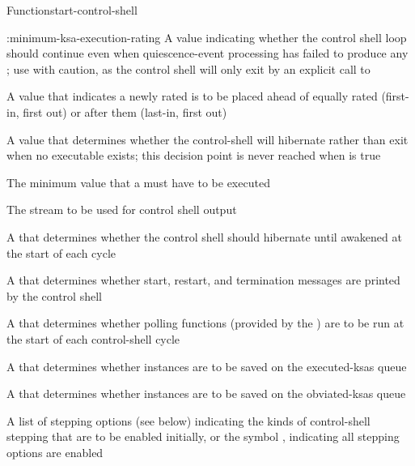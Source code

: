 \documentclass[10pt,twoside,english,pdftex]{article}
\begin{document}
\begin{functiondoc}{Function}{start-control-shell}
\begin{keywords}{:minimum-ksa-execution-rating}
   A  value
  indicating whether the control shell loop should continue even when
  quiescence-event processing has failed to produce any
  ; use with caution, as the control shell will only
  exit by an explicit call to \textbf{}

   A  value that
  indicates a newly rated  is to be placed ahead of equally
  rated  (first-in, first out) or after them (last-in, first out)

   A  value that
  determines whether the control-shell will hibernate rather than exit
  when no executable  exists; this decision point is never reached when
   is true

   The minimum  value
  that a  must have to be executed

   The stream to be used for control shell 
  output

  \keyword[:pause] A  that determines
  whether the control shell should hibernate until awakened at the
  start of each cycle

  \keyword[:print] A  that determines
  whether start, restart, and termination messages are printed by the
  control shell 

   A  that
  determines whether polling functions (provided by the
  )
  are to be run at the start of each control-shell cycle

   A  that determines
  whether  instances are to be saved on the executed-ksas
  queue

   A  that determines
  whether  instances are to be saved on the obviated-ksas
  queue

  \keyword[:stepping] A list of stepping options (see below) indicating the
  kinds of control-shell stepping that are to be enabled initially, or the
  symbol , indicating all stepping options are enabled


\end{keywords}
\end{functiondoc}
\end{document}
